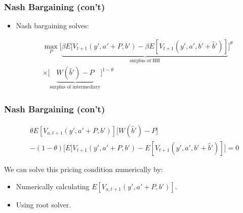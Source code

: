 \documentclass[handout]{beamer}
\begin{document}
\begin{frame}
\frametitle{Nash Bargaining (con't)}

\begin{itemize}[<+->]

\item Nash bargaining solves:

\begin{align*}
\max_{P} \Bigg[\underbrace{\beta E[V_{t+1}(y', a' + P, b') - \beta E[V_{t+1}(y', a', b' + \hat{b}')]}_{\text{surplus of HH}}\Bigg]^\theta \\
\times \Bigg[\underbrace{ W(\hat{b}') - P}_{\text{surplus of intermediary}}\Bigg]^{1-\theta}
\end{align*}

\hyperlink{nb_foc}{ }

\end{itemize}

\end{frame}



\begin{frame}
\frametitle{Nash Bargaining (con't)}

\begin{align*}
&\theta E[V_{a,t+1}(y', a' + P, b')] \Bigg[ W(\hat{b}') - P\Bigg]\\
&- (1-\theta)\Bigg[ E[V_{t+1}(y', a' + P, b') - E[V_{t+1}(y', a', b' + \hat{b}')]\Bigg] = 0
\end{align*}

\bigskip

We can solve this pricing condition numerically by:

\begin{itemize}[<+->]
\item Numerically calculating $E[V_{a,t+1}(y', a' + P, b')]$.
\item Using root solver.
\end{itemize}

\end{frame}
\end{document}
